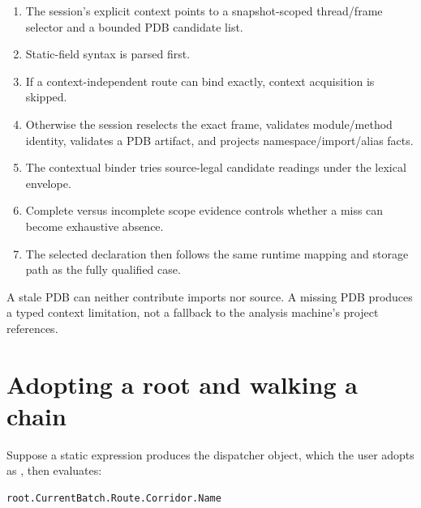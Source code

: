 \documentclass[11pt,oneside,openany]{book}
\newcommand{\codeinline}[1]{\texttt{\detokenize{#1}}}
\begin{document}
\begin{enumerate}
  \item The session's explicit context points to a snapshot-scoped thread/frame selector and a bounded PDB candidate list.
  \item Static-field syntax is parsed first.
  \item If a context-independent route can bind exactly, context acquisition is skipped.
  \item Otherwise the session reselects the exact frame, validates module/method identity, validates a PDB artifact, and projects namespace/import/alias facts.
  \item The contextual binder tries source-legal candidate readings under the lexical envelope.
  \item Complete versus incomplete scope evidence controls whether a miss can become exhaustive absence.
  \item The selected declaration then follows the same runtime mapping and storage path as the fully qualified case.
\end{enumerate}

A stale PDB can neither contribute imports nor source. A missing PDB produces a typed context limitation, not a fallback to the analysis machine's project references.

\section{Adopting a root and walking a chain}

Suppose a static expression produces the dispatcher object, which the user adopts as \codeinline{root}, then evaluates:

\begin{lstlisting}[language={},numbers=none]
root.CurrentBatch.Route.Corridor.Name
\end{lstlisting}
\end{document}
